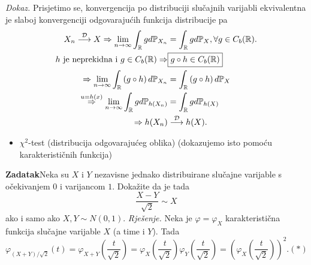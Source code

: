 \documentclass{article}
\begin{document}
\textit{Dokaz.}\newline
Prisjetimo se, konvergencija po distribuciji slučajnih varijabli ekvivalentna je slaboj konvergenciji odgovarajućih funkcija distribucije pa \[\begin{aligned}X_n\overset{\mathcal D}{\longrightarrow}X\Rightarrow\lim_{n\to\infty}\int_{\Bbb R}gd\Bbb P_{X_n}&=\int_{\Bbb R}gd\Bbb P_X,\forall g\in C_b(\Bbb R).\\h\text{ je neprekidna i }g\in C_b(\Bbb R)\Rightarrow &\boxed{g\circ h\in C_b(\Bbb R)}\\\Rightarrow\lim_{n\to\infty}\int_{\Bbb R}\left(g\circ h\right)d\Bbb P_{X_n}&=\int_{\Bbb R}\left(g\circ h\right)d\Bbb P_X\\\overset{u=h(x)}{\Rightarrow}\lim_{n\to\infty}\int_{\Bbb R}gd\Bbb P_{h(X_n)}&=\int_{\Bbb R}gd\Bbb P_{h(X)}\\\Rightarrow h(X_n)&\overset{\mathcal D}{\longrightarrow}h(X).\end{aligned}\]
\begin{itemize}
    \item[\ding{113}] \(\chi^2\)-test (distribucija odgovarajućeg oblika) (dokazujemo isto pomoću karakterističnih funkcija)
\end{itemize}
\textbf{Zadatak}\newline Neka su \(X\) i \(Y\) nezavisne jednako distribuirane slučajne varijable s očekivanjem \(0\) i varijancom \(1.\) Dokažite da je tada \[\frac{X-Y}{\sqrt 2}\sim X\] ako i samo ako \(X,Y\sim N(0,1).\)\newline\newline
\textit{Rješenje.}\newline
Neka je \(\varphi=\varphi_X\) karakteristična funkcija slučajne varijable \(X\) (a time i \(Y\)). Tada \[\varphi_{(X+Y)/\sqrt 2}(t)=\varphi_{X+Y}\left(\frac{t}{\sqrt 2}\right)=\varphi_X\left(\frac{t}{\sqrt 2}\right)\varphi_Y\left(\frac{t}{\sqrt 2}\right)=\left(\varphi_X\left(\frac{t}{\sqrt 2}\right)\right)^2.(*)\]
\end{document}
